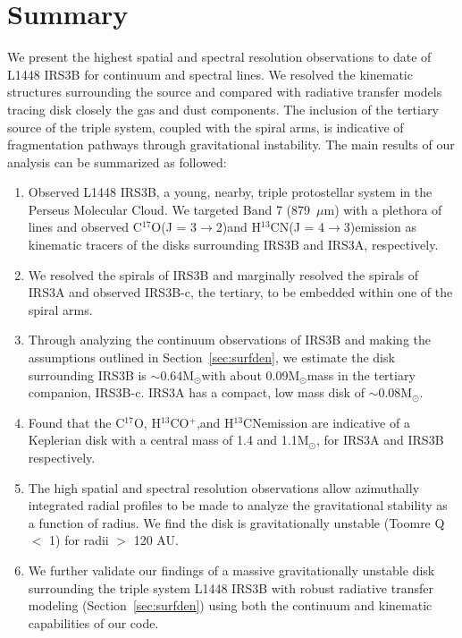 \documentclass[preprint,12pt]{aastex62}
\newcommand{\htcn}{H$^{13}$CN}
\newcommand{\cso}{C$^{17}$O}
\newcommand{\htcop}{H$^{13}$CO$^+$}
\newcommand{\lhtcn}{\htcn\space   (J = 4$\rightarrow$3)}   %
\newcommand{\lcso}{\cso\space    (J = 3$\rightarrow$2)}   %
\renewcommand{\micron}{$\mu$m}
\newcommand{\ab}{$\sim$}
\newcommand{\solm}{M$_{\odot}$}
\begin{document}
\section{Summary}
We present the highest spatial and spectral resolution observations to date of L1448 IRS3B for continuum and spectral lines. We resolved the kinematic structures surrounding the source and compared with radiative transfer models tracing disk closely the gas and dust components. The inclusion of the tertiary source of the triple system, coupled with the spiral arms, is indicative of fragmentation pathways through gravitational instability. The main results of our analysis can be summarized as followed:
\begin{enumerate}
    \item Observed L1448 IRS3B, a young, nearby, triple protostellar system in the Perseus Molecular Cloud. We targeted Band 7 (879~\micron) with a plethora of lines and observed \lcso\space and \lhtcn\space emission as kinematic tracers of the disks surrounding IRS3B and IRS3A, respectively.
    \item We resolved the spirals of IRS3B and marginally resolved the spirals of IRS3A and observed IRS3B-c, the tertiary, to be embedded within one of the spiral arms.
    \item Through analyzing the continuum observations of IRS3B and making the assumptions outlined in Section~\ref{sec:surfden}, we estimate the disk surrounding IRS3B is \ab0.64\solm\space with about 0.09\solm\space mass in the tertiary companion, IRS3B-c. IRS3A has a compact, low mass disk of \ab0.08\solm.
    \item Found that the \cso, \htcop,and \htcn\space emission are indicative of a Keplerian disk with a central mass of 1.4 and 1.1\solm, for IRS3A and IRS3B respectively.
    \item The high spatial and spectral resolution observations allow azimuthally integrated radial profiles to be made to analyze the gravitational stability as a function of radius. We find the disk is gravitationally unstable (Toomre Q $<$ 1) for radii $>$ 120 AU.
    \item We further validate our findings of a massive gravitationally unstable disk surrounding the triple system L1448 IRS3B with robust radiative transfer modeling (Section~\ref{sec:surfden}) using both the continuum and kinematic capabilities of our code.
\end{enumerate}
\end{document}

